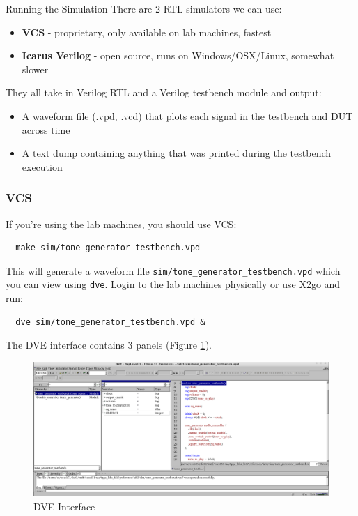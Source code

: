 \documentclass[11pt]{article}
\makeatletter
\renewcommand{\subsection}
{\@startsection {subsection}{1}{0pt}
 {-1ex}
 {0.5ex}
 {\bfseries\normalsize}}
\makeatother
\begin{document}
\subsection{Running the Simulation}
There are 2 RTL simulators we can use:
\begin{itemize}
  \item \textbf{VCS} - proprietary, only available on lab machines, fastest
  \item \textbf{Icarus Verilog} - open source, runs on Windows/OSX/Linux, somewhat slower
\end{itemize}
They all take in Verilog RTL and a Verilog testbench module and output:
\begin{itemize}
  \item A waveform file (.vpd, .vcd) that plots each signal in the testbench and DUT across time
  \item A text dump containing anything that was printed during the testbench execution
\end{itemize}

\subsubsection{VCS}
If you're using the lab machines, you should use VCS:
\begin{verbatim}
  make sim/tone_generator_testbench.vpd
\end{verbatim}
This will generate a waveform file \verb|sim/tone_generator_testbench.vpd| which you can view using \verb|dve|.
Login to the lab machines physically or use X2go and run:
\begin{verbatim}
  dve sim/tone_generator_testbench.vpd &
\end{verbatim}

The DVE interface contains 3 panels (Figure \ref{fig:dve}).
\begin{figure}[h]
  \centering
  \includegraphics[width=\textwidth]{figs/dve.png}
  \caption{DVE Interface}
  \label{fig:dve}
\end{figure}
\end{document}
